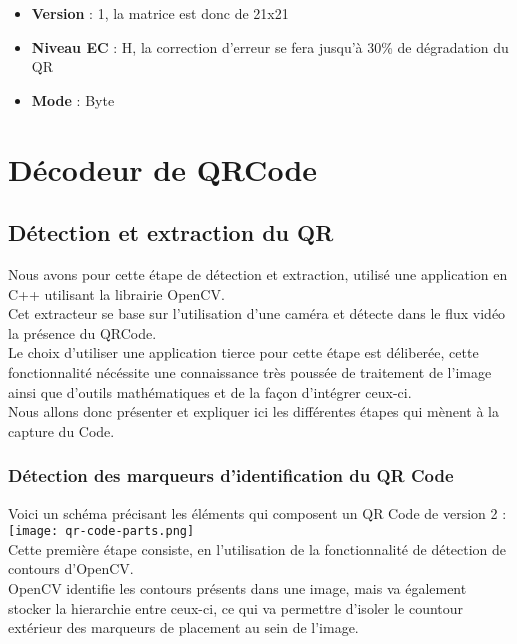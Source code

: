 \documentclass{report}
\begin{document}
		\begin{itemize}
			\item \textbf{Version} : 1, la matrice est donc de 21x21
			\item \textbf{Niveau EC} : H, la correction d'erreur se fera jusqu'à 30\% de dégradation du QR
			\item \textbf{Mode} : Byte
		\end{itemize}

\chapter{Décodeur de QRCode}

	\section{Détection et extraction du QR}

		Nous avons pour cette étape de détection et extraction, utilisé une application en C++ utilisant la librairie OpenCV.\\
		Cet extracteur se base sur l'utilisation d'une caméra et détecte dans le flux vidéo la présence du QRCode.\\

		Le choix d'utiliser une application tierce pour cette étape est déliberée, cette fonctionnalité nécéssite une connaissance très poussée de traitement de l'image ainsi que d'outils mathématiques et de la façon d'intégrer ceux-ci.\\

		Nous allons donc présenter et expliquer ici les différentes étapes qui mènent à la capture du Code.\\

		\subsection{Détection des marqueurs d'identification du QR Code}

			Voici un schéma précisant les éléments qui composent un QR Code de version 2 : \\

			\texttt{[image: qr-code-parts.png]}\\

			Cette première étape consiste, en l'utilisation de la fonctionnalité de détection de contours d'OpenCV.\\
			OpenCV identifie les contours présents dans une image, mais va également stocker la hierarchie entre ceux-ci, ce qui va permettre d'isoler le countour extérieur des marqueurs de placement au sein de l'image.\\
\end{document}
